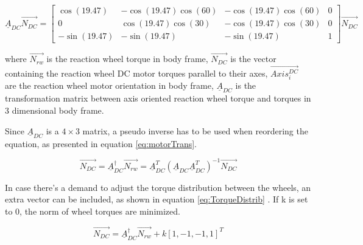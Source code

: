 \begin{equation}
\underline{A}_{DC} \vec{N_{DC}}  = 
\begin{bmatrix}
\cos(19.47)       & -\cos(19.47) \cos(60)  &  -\cos(19.47) \cos(60)  & 0 \\
0       & \cos(19.47) \cos(30)  &  -\cos(19.47) \cos(30)  & 0 \\
-\sin(19.47)       & -\sin(19.47)   &  -\sin(19.47)   & 1
\end{bmatrix} \vec{N_{DC}}
\label{transmatrix}
\end{equation}

where $\vec{N_{rw}}$ is the reaction wheel torque in body frame, $\vec{N_{DC}}$ is the vector containing the reaction wheel DC motor torques parallel to their axes, $\vec{Axis^{DC}_{i}}$ are the reaction wheel motor orientation in body frame, $\underline{A}_{DC}$ is the transformation matrix between axis oriented reaction wheel torque and torques in 3 dimensional body frame.



Since $\underline{A}_{DC} $ is a $ 4 \times 3 $ matrix, a pseudo inverse has to be used when reordering the equation, as presented in equation \ref{eq:motorTrans}. 

\begin{equation}
\label{eq:motorTrans}
\vec{N_{DC}} =  \underline{A}_{DC} ^\dagger \vec{N_{rw}}   =  \underline{A}_{DC}^T  (\underline{A}_{DC} \underline{A}_{DC} ^T)^{-1} \vec{N_{DC}}
\end{equation}



In case there's a demand to adjust the torque distribution between the wheels, an extra vector can be included, as shown in equation \ref{eq:TorqueDistrib}
\cite[equation 18.41-42]{SADC}. If k is set to 0, the norm of wheel torques are minimized.

\begin{equation}
\label{eq:TorqueDistrib}
 \vec{N_{DC}} = \underline{A}^\dagger_{DC} \vec{N_{rw}}  + k\left[1,-1,-1,1\right]^T
\end{equation}

